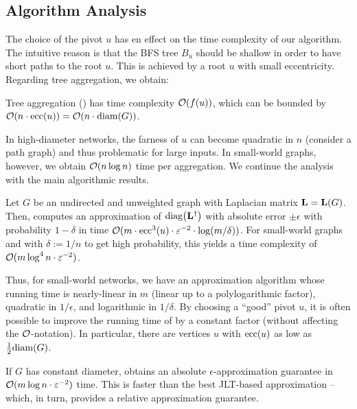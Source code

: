 

\subsection{Algorithm Analysis}
The choice of the pivot $u$ has en effect on the time complexity of our algorithm.
The intuitive reason is that the BFS tree $B_u$ should be shallow in order to have short paths
to the root $u$. This is achieved by a root $u$ with small eccentricity.
Regarding tree aggregation, we obtain:

\begin{lemma}
Tree aggregation () has time complexity $\mathcal{O}(f(u))$,
which can be bounded by $\mathcal{O}(n\cdot \text{ecc}(u)) = \mathcal{O}(n\cdot \text{diam}(G))$.
\end{lemma}

In high-diameter networks, the farness of $u$ can become quadratic in $n$ (consider a path graph)
and thus problematic for large inputs.
In small-world graphs, however, we obtain $\mathcal{O}(n \log n)$ time per aggregation.
We continue the analysis with the main algorithmic results.

\begin{theorem}
\label{theo:el-clos:diag-apx-algo}
Let $G$ be an undirected and unweighted graph with Laplacian matrix $\mathbf{L} = \mathbf{L}(G)$. Then, 
computes an approximation of $\diag{\Linv}$ with absolute error $\pm\epsilon$ with probability $1 - \delta$
in time $\mathcal{O}(m\cdot\text{ecc}^3(u)\cdot\varepsilon^{-2}\cdot\log(m/\delta))$.
For small-world graphs and with $\delta := 1/n$ to get high probability, this yields a time complexity
of $\mathcal{O}(m\log^4n\cdot\varepsilon^{-2})$.
\end{theorem}

Thus, for small-world networks, we have an approximation algorithm whose running time is nearly-linear
in $m$ (\ie linear up to a polylogarithmic factor), quadratic in $1/\epsilon$, and logarithmic
in $1/\delta$. By choosing a \enquote{good} pivot $u$, it is often possible to improve the running time
of  by a constant factor (\ie without affecting the $\mathcal{O}$-notation).
In particular, there are vertices $u$ with $\text{ecc}(u)$ as low as $\frac 12 \text{diam}(G)$.

\begin{remark}
If $G$ has constant diameter,  obtains an absolute
$\epsilon$-approximation guarantee in $\mathcal{O}(m\log n\cdot \varepsilon^{-2})$ time.
This is faster than the best JLT-based approximation -- which, in turn, provides a
relative approximation guarantee.
\end{remark}

